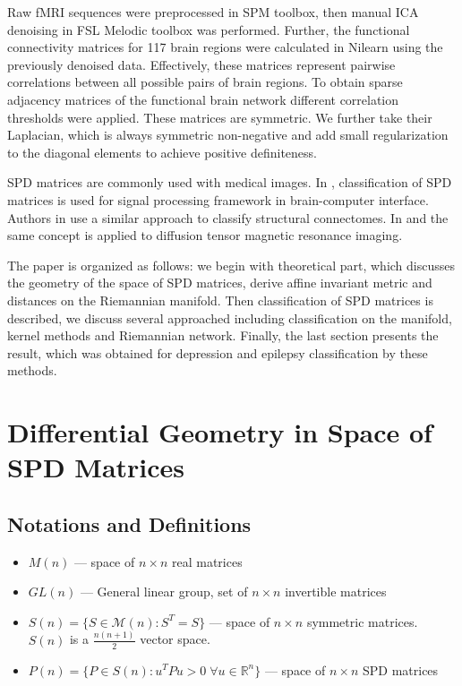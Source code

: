 \documentclass[12pt]{extarticle}
\theoremstyle{definition}
\theoremstyle{remark}
\begin{document}
	Raw fMRI sequences were preprocessed in SPM toolbox, then manual ICA denoising in FSL Melodic toolbox was performed. Further, the functional connectivity matrices for 117 brain regions were calculated in Nilearn using the previously denoised data. Effectively, these matrices represent pairwise correlations between all possible pairs of brain regions. To obtain sparse adjacency matrices of the functional brain network different correlation thresholds were applied. These matrices are symmetric. We further take their Laplacian, which is always symmetric non-negative and add small regularization to the diagonal elements to achieve positive definiteness.
	
	SPD matrices are commonly used with medical images. In \cite{Barachant2010},\cite{Barachant2013} classification of SPD matrices is used for signal processing framework in brain-computer interface. Authors in \cite{Unknown} use a similar approach to classify structural connectomes. In \cite{Pennec2006} and \cite{Arsigny2007} the same concept is applied to diffusion tensor magnetic resonance imaging.
	
	The paper is organized as follows: we begin with theoretical part, which discusses the geometry of the space of SPD matrices, derive affine invariant metric and distances on the Riemannian manifold.  Then classification of SPD matrices is described, we discuss several approached including classification on the manifold, kernel methods and Riemannian network. Finally, the last section presents the result, which was obtained for depression and epilepsy classification by these methods.
	\newpage
	\section{Differential Geometry in Space of SPD Matrices}
	\subsection{Notations and Definitions}
	
	\begin{itemize}
		\item $M(n)$ --- space of $n\times n$ real matrices
		\item $GL(n)$ --- General linear group, set of  $n\times n$ invertible matrices
		\item $S(n) = \{S \in \mathcal{M}(n): S^T = S  \}$ --- space of $n\times n$ symmetric matrices. \\
		$S(n)$ is a $\frac{n(n+1)}{2}$ vector space.
		\item $P(n) = \{P \in S(n): u^TPu > 0 \; \forall u \in \mathbb{R}^n  \}$ --- space of $n\times n$ SPD matrices
	\end{itemize}
	
\end{document}
